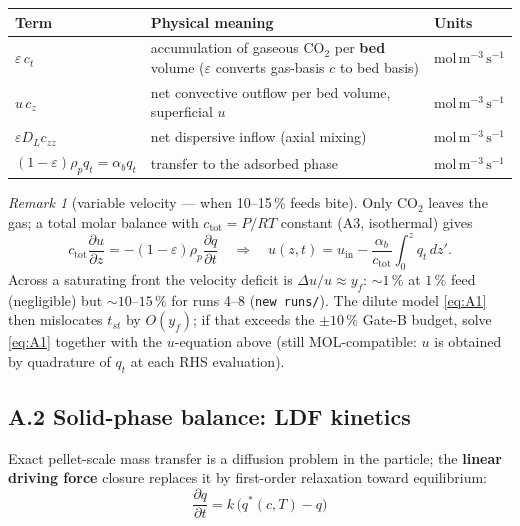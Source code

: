 \documentclass[11pt]{article}
\theoremstyle{remark}
\newtheorem{remark}{Remark}
\begin{document}
\begin{center}
\begin{tabular}{@{}l l l@{}}
\toprule
Term & Physical meaning & Units \\
\midrule
$\varepsilon\,c_t$ & accumulation of gaseous CO$_2$ per \textbf{bed} volume
  ($\varepsilon$ converts gas-basis $c$ to bed basis) & $\mathrm{mol\,m^{-3}\,s^{-1}}$ \\
$u\,c_z$ & net convective outflow per bed volume, superficial $u$ & $\mathrm{mol\,m^{-3}\,s^{-1}}$ \\
$\varepsilon D_L c_{zz}$ & net dispersive inflow (axial mixing) & $\mathrm{mol\,m^{-3}\,s^{-1}}$ \\
$(1-\varepsilon)\rho_p q_t = \alpha_b q_t$ & transfer to the adsorbed phase & $\mathrm{mol\,m^{-3}\,s^{-1}}$ \\
\bottomrule
\end{tabular}
\end{center}

\begin{remark}[variable velocity --- when 10--15\,\% feeds bite]\label{rem:A1}
Only CO$_2$ leaves the gas; a total molar balance with $c_{\mathrm{tot}}=P/RT$
constant (A3, isothermal) gives
\begin{equation*}
c_{\mathrm{tot}}\frac{\partial u}{\partial z} = -(1-\varepsilon)\rho_p\frac{\partial q}{\partial t}
\quad\Longrightarrow\quad
u(z,t)=u_{\mathrm{in}}-\frac{\alpha_b}{c_{\mathrm{tot}}}\int_0^z q_t\,dz'.
\end{equation*}
Across a saturating front the velocity deficit is $\Delta u/u \approx y_f$:
${\sim}1\,\%$ at $1\,\%$ feed (negligible) but ${\sim}10$--$15\,\%$ for runs 4--8
(\texttt{new runs/}). The dilute model \eqref{eq:A1} then mislocates $t_{st}$ by
$O(y_f)$; if that exceeds the $\pm10\,\%$ Gate-B budget, solve \eqref{eq:A1}
together with the $u$-equation above (still MOL-compatible: $u$ is obtained by
quadrature of $q_t$ at each RHS evaluation).
\end{remark}

\subsection*{A.2 Solid-phase balance: LDF kinetics}

Exact pellet-scale mass transfer is a diffusion problem in the particle; the
\textbf{linear driving force} closure replaces it by first-order relaxation toward
equilibrium:
\begin{equation}
\boxed{\;\frac{\partial q}{\partial t} = k\,\bigl(q^*(c,T)-q\bigr)\;}
\tag{A.2}\label{eq:A2}
\end{equation}
\end{document}
